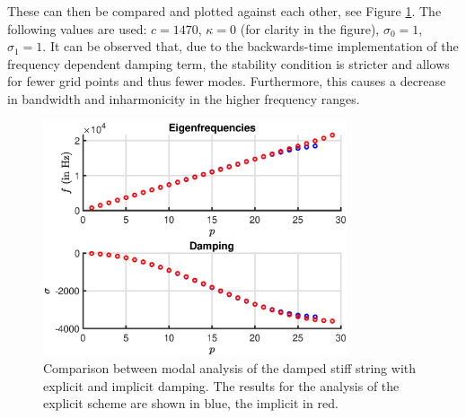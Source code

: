 \documentclass{article}
\begin{document}
These can then be compared and plotted against each other, see Figure \ref{fig:expImpComp}. The following values are used: $c = 1470$, $\kappa = 0$ (for clarity in the figure), $\sigma_0 = 1$, $\sigma_1 = 1$. It can be observed that, due to the backwards-time implementation of the frequency dependent damping term, the stability condition is stricter and allows for fewer grid points and thus fewer modes. Furthermore, this causes a decrease in bandwidth and inharmonicity in the higher frequency ranges.

\begin{figure}
    \centering
    \includegraphics[width = 0.8\textwidth]{expImpComp.eps}
    \caption{Comparison between modal analysis of the damped stiff string with explicit and implicit damping. The results for the analysis of the explicit scheme are shown in blue, the implicit in red.}
    \label{fig:expImpComp}
\end{figure}


\end{document}
